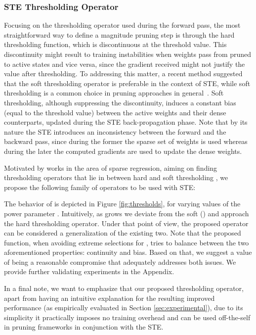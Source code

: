 \documentclass{article}
\begin{document}
\subsubsection{STE Thresholding Operator}


Focusing on the thresholding operator used during the forward pass, the most straightforward way to define a magnitude pruning step is through the hard thresholding function, which is discontinuous at the threshold value. This discontinuity might result to training instabilities when weights pass from pruned to active states and vice versa, since the gradient received might not justify the value after thresholding. To addressing this matter, a recent method \cite{vanderschueren2023straight} suggested that the soft thresholding operator is preferable in the context of STE, while soft thresholding is a common choice in pruning approaches in general~\cite{kusupati2020soft}. Soft thresholding, although suppressing the discontinuity, induces a constant bias (equal to the threshold value) between the active weights and their dense counterparts, updated during the STE back-propagation phase. Note that by its nature the STE introduces an inconsistency between the forward and the backward pass, since during the former the sparse set of weights is used whereas during the later the computed gradients are used to update the dense weights.

Motivated by works in the area of sparse regression, aiming on finding thresholding operators that lie in between hard and soft thresholding \cite{liu2020between, hagiwara2022bridging}, we propose the following family of operators to be used with STE:

The behavior of  is depicted in Figure \ref{fig:thresholds}, for varying values of the power parameter . Intuitively, as  grows we deviate from the soft () and approach the hard thresholding operator. Under that point of view, the proposed operator can be considered a generalization of the existing two.  Note that the proposed function, when avoiding extreme selections for , tries to balance between the two aforementioned properties: continuity and bias. Based on that, we suggest a value of  being a reasonable compromise that adequately addresses both issues. 
We provide further validating experiments in the Appendix.

In a final note, we want to emphasize that our proposed thresholding operator, apart from having an intuitive explanation for the resulting improved performance (as empirically evaluated in Section \ref{sec:experimental}), due to its simplicity it practically imposes no training overhead and can be used off-the-self in pruning frameworks in conjunction with the STE. 
\end{document}
